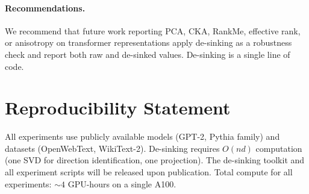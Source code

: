 \documentclass[11pt]{article}
\begin{document}
\paragraph{Recommendations.}
We recommend that future work reporting PCA, CKA, RankMe, effective rank, or anisotropy on transformer representations apply de-sinking as a robustness check and report both raw and de-sinked values. De-sinking is a single line of code.


\section*{Reproducibility Statement}
All experiments use publicly available models (GPT-2, Pythia family) and datasets (OpenWebText, WikiText-2). De-sinking requires $O(nd)$ computation (one SVD for direction identification, one projection). The de-sinking toolkit and all experiment scripts will be released upon publication. Total compute for all experiments: ${\sim}4$ GPU-hours on a single A100.

\newpage
\end{document}
